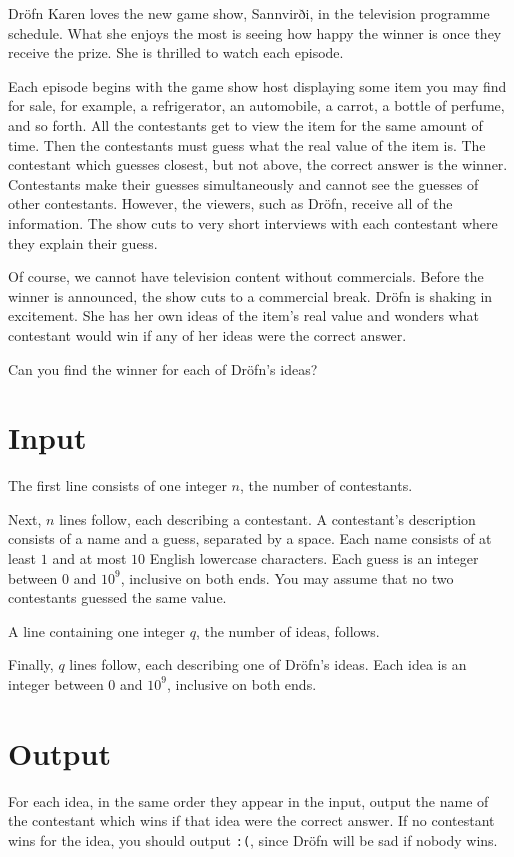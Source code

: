
Dröfn Karen loves the new game show, Sannvirði, in the television programme schedule.
What she enjoys the most is seeing how happy the winner is once they receive the prize.
She is thrilled to watch each episode.

Each episode begins with the game show host displaying some item you may find for sale, for example, a refrigerator, an automobile, a carrot, a bottle of perfume, and so forth.
All the contestants get to view the item for the same amount of time.
Then the contestants must guess what the real value of the item is.
The contestant which guesses closest, but not above, the correct answer is the winner.
Contestants make their guesses simultaneously and cannot see the guesses of other contestants.
However, the viewers, such as Dröfn, receive all of the information.
The show cuts to very short interviews with each contestant where they explain their guess.

Of course, we cannot have television content without commercials.
Before the winner is announced, the show cuts to a commercial break.
Dröfn is shaking in excitement.
She has her own ideas of the item's real value and wonders what contestant would win if any of her ideas were the correct answer.

Can you find the winner for each of Dröfn's ideas?

\section*{Input}
The first line consists of one integer $n$, the number of contestants.

Next, $n$ lines follow, each describing a contestant.
A contestant's description consists of a name and a guess, separated by a space.
Each name consists of at least $1$ and at most $10$ English lowercase characters.
Each guess is an integer between $0$ and $10^9$, inclusive on both ends.
You may assume that no two contestants guessed the same value.

A line containing one integer $q$, the number of ideas, follows.

Finally, $q$ lines follow, each describing one of Dröfn's ideas.
Each idea is an integer between $0$ and $10^9$, inclusive on both ends.

\section*{Output}
For each idea, in the same order they appear in the input, output the name of the contestant which wins if that idea were the correct answer.
If no contestant wins for the idea, you should output \texttt{:(}, since Dröfn will be sad if nobody wins.

